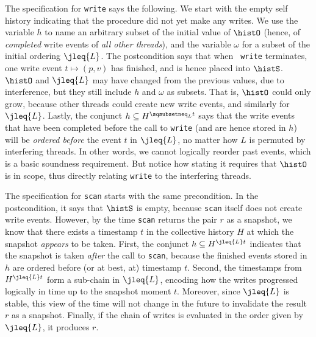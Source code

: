 The specification for {\tt write} says the following. We start with
the empty self history indicating that the procedure did not yet make
any writes. We use the variable $h$ to name an arbitrary subset of the
initial value of $\histO$ (hence, of \emph{completed} write events of
\emph{all other threads}), and the variable $\omega$ for a subset of
the initial ordering $\jleq{\ordlist}$. The postcondition says that when {\tt
  write} terminates, one write event $t \mapsto (p, v)$ has finished,
and is hence placed into $\histS$.  $\histO$ and $\jleq{\ordlist}$ may have
changed from the previous values, due to interference, but they still
include $h$ and $\omega$ as subsets. That is, $\histO$ could only
grow, because other threads could create new write events, and
similarly for $\jleq{\ordlist}$. Lastly, the conjunct $h \subseteq
H^{\hbox{}\sqsubsetneq_\ordlist t}$ says that the write events that
have been completed before the call to {\tt write} (and are hence
stored in $h$) will be \emph{ordered before} the event $t$ in $\jleq{\ordlist}$,
no matter how $L$ is permuted by interfering threads. In other words,
we cannot logically reorder past events, which is a basic soundness
requirement. But notice how stating it requires that $\histO$ is in
scope, thus directly relating {\tt write} to the interfering threads.

The specification for {\tt scan} starts with the same precondition. In
the postcondition, it says that $\histS$ is empty, because {\tt scan}
itself does not create write events. However, by the time {\tt scan}
returns the pair $r$ as a snapshot, we know that there exists a
timestamp $t$ in the collective history $H$ at which the snapshot
\emph{appears} to be taken. First, the conjunct $h \subseteq
H^{\hbox{}\jleq{\ordlist} t}$ indicates that the snapshot is taken \emph{after}
the call to {\tt scan}, because the finished events stored in $h$ are
ordered before (or at best, at) timestamp $t$.
%
%
%
Second, the timestamps from $H^{\hbox{}\jleq{\ordlist} t}$ form a sub-chain in
$\jleq{\ordlist}$,  %
%
encoding how the writes progressed logically in time up to the
snapshot moment $t$. Moreover, since $\jleq{\ordlist}$ is stable, this view
of the time will not change in the future to invalidate the result $r$
as a snapshot. Finally, if the chain of writes is evaluated in the
order given by $\jleq{\ordlist}$, it produces $r$.


